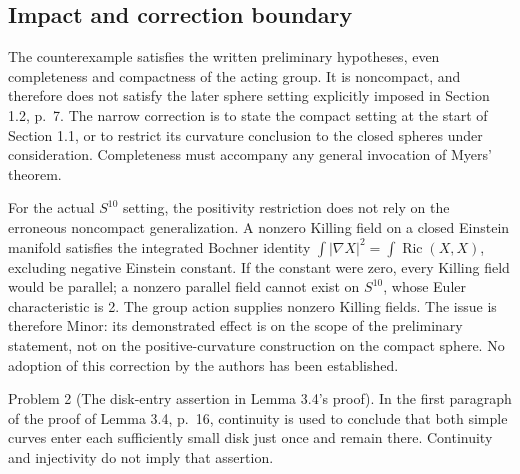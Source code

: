 \documentclass[10pt]{article}
\begin{document}
\subsection*{Impact and correction boundary}
The counterexample satisfies the written preliminary hypotheses, even completeness and compactness of the acting group. It is noncompact, and therefore does not satisfy the later sphere setting explicitly imposed in Section 1.2, p. 7. The narrow correction is to state the compact setting at the start of Section 1.1, or to restrict its curvature conclusion to the closed spheres under consideration. Completeness must accompany any general invocation of Myers’ theorem.\par
For the actual \(S^{10}\) setting, the positivity restriction does not rely on the erroneous noncompact generalization. A nonzero Killing field on a closed Einstein manifold satisfies the integrated Bochner identity \(\int|\nabla X|^2=\int\operatorname{Ric}(X,X)\), excluding negative Einstein constant. If the constant were zero, every Killing field would be parallel; a nonzero parallel field cannot exist on \(S^{10}\), whose Euler characteristic is 2. The group action supplies nonzero Killing fields. The issue is therefore Minor: its demonstrated effect is on the scope of the preliminary statement, not on the positive-curvature construction on the compact sphere. No adoption of this correction by the authors has been established.\par
Problem 2 (The disk-entry assertion in Lemma 3.4’s proof).  In the first paragraph of the proof of Lemma 3.4, p. 16, continuity is used to conclude that both simple curves enter each sufficiently small disk just once and remain there. Continuity and injectivity do not imply that assertion.\par
\end{document}
